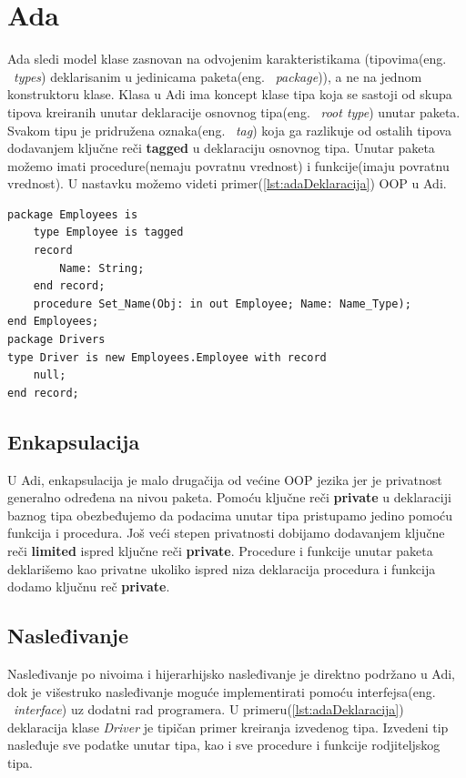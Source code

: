 \documentclass[a4paper]{article}
\begin{document}
{\section{Ada}
\label{sec:ada}

Ada sledi model klase zasnovan na odvojenim karakteristikama (tipovima(eng. ~{\em types}) deklarisanim u jedinicama paketa(eng. ~{\em package})), a ne na jednom konstruktoru klase\cite{oopAda}. Klasa u Adi ima koncept klase tipa koja se sastoji od skupa tipova kreiranih unutar deklaracije osnovnog tipa(eng. ~{\em root type}) unutar paketa. Svakom tipu je pridružena oznaka(eng. ~{\em tag}) koja ga razlikuje od ostalih tipova dodavanjem ključne reči \textbf{tagged} u deklaraciju osnovnog tipa. Unutar paketa možemo imati procedure(nemaju povratnu vrednost) i funkcije(imaju povratnu vrednost). U nastavku možemo videti primer(\ref{lst:adaDeklaracija}) OOP u Adi.

\begin{lstlisting}[caption={Primer objektno orijentisanog programiranja u jeziku Ada.},frame=single, label=lst:adaDeklaracija]
package Employees is 
	type Employee is tagged 
	record
		Name: String;
	end record;
	procedure Set_Name(Obj: in out Employee; Name: Name_Type);
end Employees;
package Drivers
type Driver is new Employees.Employee with record
	null;
end record;
\end{lstlisting}

\subsection{Enkapsulacija}
\label{subsec:adaEnkapsulacija}
U Adi, enkapsulacija je malo drugačija od većine OOP jezika jer je privatnost generalno određena na nivou paketa\cite{adaIntroduction}. Pomoću ključne reči \textbf{private} u deklaraciji baznog tipa obezbeđujemo da podacima unutar tipa pristupamo jedino pomoću funkcija i procedura. Još veći stepen privatnosti dobijamo dodavanjem ključne reči \textbf{limited} ispred ključne reči \textbf{private}. Procedure i funkcije unutar paketa deklarišemo kao privatne ukoliko ispred niza deklaracija procedura i funkcija dodamo ključnu reč \textbf{private}.

\subsection{Nasleđivanje}
\label{subsec:adaNasledjivanje}
Nasleđivanje po nivoima i hijerarhijsko nasleđivanje je direktno podržano u Adi, dok je višestruko nasleđivanje moguće implementirati pomoću interfejsa(eng. ~{\em interface}) uz dodatni rad programera. U primeru(\ref{lst:adaDeklaracija}) deklaracija klase \textit{Driver} je tipičan primer kreiranja izvedenog tipa. Izvedeni tip nasleđuje sve podatke unutar tipa, kao i sve procedure i funkcije rodjiteljskog tipa.

}
\end{document}
